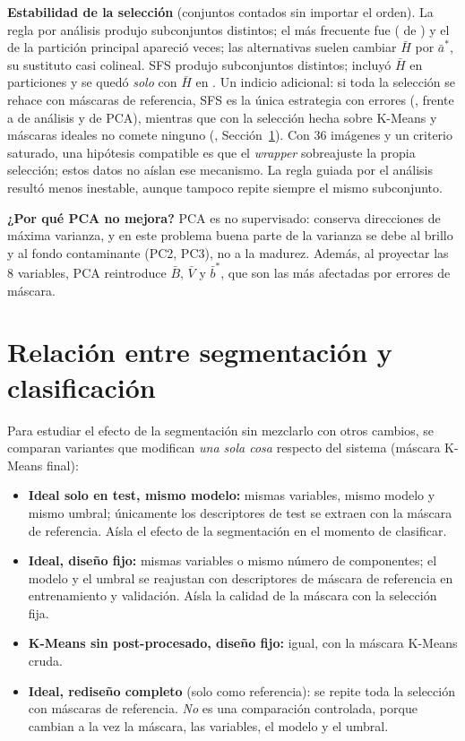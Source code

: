 \documentclass[11pt,a4paper]{article}
\begin{document}
\textbf{Estabilidad de la selección} (conjuntos contados sin importar el orden). La regla por
análisis produjo \AnDistinctSubsets{} subconjuntos distintos; el más frecuente fue
\AnTopSubset{} (\AnTopSubsetCount{} de \NRepeats) y el de la partición principal apareció
\AnMainSubsetCount{} veces; las alternativas suelen cambiar $\bar H$ por $\bar a^*$, su
sustituto casi colineal. SFS produjo \SfsDistinctSubsets{} subconjuntos distintos; incluyó $\bar H$ en \SfsWithHCount{} particiones y se quedó \emph{solo} con
$\bar H$ en \SfsOnlyHCount. Un indicio adicional: si toda la selección se rehace con máscaras
de referencia, SFS es la única estrategia con errores (\SfsRepRefErr, frente a \AnRepRefErr{}
de análisis y \PcaRepRefErr{} de PCA), mientras que con la selección hecha sobre K-Means y
máscaras ideales no comete ninguno (\SfsRepFixErr, Sección~\ref{sec:integ}). Con 36 imágenes y
un criterio saturado, una hipótesis compatible es que el \emph{wrapper} sobreajuste la propia
selección; estos datos no aíslan ese mecanismo. La regla guiada por el análisis resultó menos
inestable, aunque tampoco repite siempre el mismo subconjunto.

\textbf{¿Por qué PCA no mejora?} PCA es no supervisado: conserva direcciones de máxima
varianza, y en este problema buena parte de la varianza se debe al brillo y al fondo
contaminante (PC2, PC3), no a la madurez. Además, al proyectar las 8 variables, PCA
reintroduce $\bar B$, $\bar V$ y $\bar b^*$, que son las más afectadas por errores de máscara.

\section{Relación entre segmentación y clasificación}\label{sec:integ}

Para estudiar el efecto de la segmentación sin mezclarlo con otros cambios, se comparan
variantes que modifican \emph{una sola cosa} respecto del sistema (máscara K-Means final):

\begin{itemize}[leftmargin=1.4em,itemsep=1pt]
\item \textbf{Ideal solo en test, mismo modelo:} mismas variables, mismo modelo y mismo
umbral; únicamente los descriptores de test se extraen con la máscara de referencia. Aísla el
efecto de la segmentación en el momento de clasificar.
\item \textbf{Ideal, diseño fijo:} mismas variables o mismo número de componentes; el modelo
y el umbral se reajustan con descriptores de máscara de referencia en entrenamiento y
validación. Aísla la calidad de la máscara con la selección fija.
\item \textbf{K-Means sin post-procesado, diseño fijo:} igual, con la máscara K-Means cruda.
\item \textbf{Ideal, rediseño completo} (solo como referencia): se repite toda la selección
con máscaras de referencia. \emph{No} es una comparación controlada, porque cambian a la vez
la máscara, las variables, el modelo y el umbral.
\end{itemize}
\end{document}
